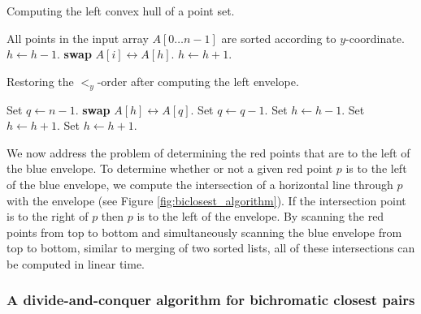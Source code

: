 \documentclass{elsart}
\begin{document}
\begin{algorithm}
  \caption{Computing the left convex hull of a point set.}
  \label{alg:leftHull}\label{alg:graham}
  \begin{algorithmic}[1]
    \REQUIRE All points in the input array $A[0\ldots n-1]$ are sorted according to
    $y$-coordinate.
        \STATE $h\gets h-1$.
      \ENDWHILE
      \STATE \textbf{swap} $A[i]\leftrightarrow A[h]$.
      \STATE $h\gets h+1$.
    \ENDFOR
  \end{algorithmic}
\end{algorithm}

\begin{algorithm}
  \caption{Restoring the $<_y$-order after computing the left
    envelope.}
  \label{alg:revertLeftHull}
  \begin{algorithmic}[1]
    \STATE Set $q\gets n-1$.
        \STATE \textbf{swap} $A[h]\leftrightarrow A[q]$.
        \STATE Set $q\gets q-1$.
          \STATE Set $h\gets h-1$.
        \ENDIF
          \STATE Set $h\gets h+1$.
        \ENDWHILE
      \ELSE
        \STATE Set $h\gets h+1$.
      \ENDIF
    \ENDWHILE
  \end{algorithmic}
\end{algorithm}

We now address the problem of determining the red points that are to
the left of the blue envelope. To determine whether or not a given red
point $p$ is to the left of the blue envelope, we compute the
intersection of a horizontal line through $p$ with the envelope (see
Figure \ref{fig:biclosest_algorithm}). If the intersection point is to
the right of $p$ then $p$ is to the left of the envelope.  By scanning
the red points from top to bottom and simultaneously scanning the blue
envelope from top to bottom, similar to merging of two sorted lists,
all of these intersections can be computed in linear time.

\subsubsection{A divide-and-conquer algorithm for bichromatic closest
pairs}
\end{document}
